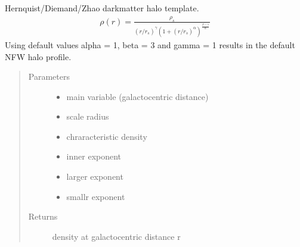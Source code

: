 \documentclass[letterpaper,10pt,english]{sphinxmanual}
\begin{document}
\begin{fulllineitems}
\label{\detokenize{diffsph.profiles:diffsph.profiles.templates.hdz}}
\sphinxAtStartPar
Hernquist/Diemand/Zhao dark\sphinxhyphen{}matter halo template.
\begin{equation*}
\begin{split}\rho(r) = \frac{\rho_s}{(r/r_s)^\gamma(1+(r/r_s)^\alpha)^{\frac{\beta-\gamma}\alpha}}\end{split}
\end{equation*}
\sphinxAtStartPar
Using default values alpha = 1, beta = 3 and gamma = 1 results in the default NFW halo profile.
\begin{quote}\begin{description}
\item[{Parameters}] \leavevmode\begin{itemize}
\item {} 
\sphinxAtStartPar
{} \textendash{} main variable (galactocentric distance)

\item {} 
\sphinxAtStartPar
{} \textendash{} scale radius

\item {} 
\sphinxAtStartPar
{} \textendash{} chraracteristic density

\item {} 
\sphinxAtStartPar
{} \textendash{} inner exponent

\item {} 
\sphinxAtStartPar
{} \textendash{} large\sphinxhyphen{}r exponent

\item {} 
\sphinxAtStartPar
{} \textendash{} small\sphinxhyphen{}r exponent

\end{itemize}

\item[{Returns}] \leavevmode
\sphinxAtStartPar
density at galactocentric distance r

\end{description}\end{quote}

\end{fulllineitems}
\end{document}
